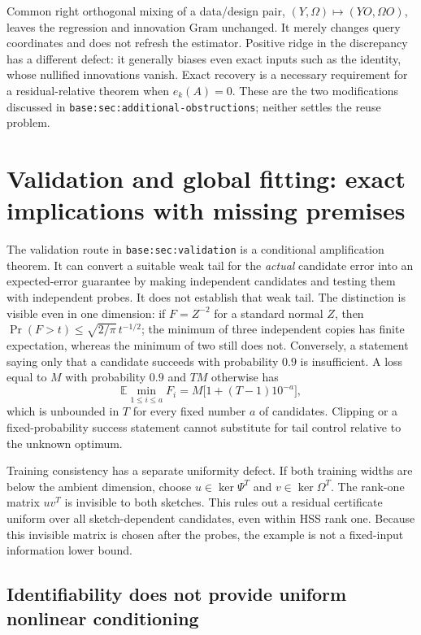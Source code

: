 \documentclass[11pt,oneside,openany,a4paper]{report}
\numberwithin{equation}{chapter}
\theoremstyle{definition}
\theoremstyle{remark}
\begin{document}
Common right orthogonal mixing of a data/design pair,
$(Y,\Omega)\mapsto(YO,\Omega O)$, leaves the regression and innovation
Gram unchanged.  It merely changes query coordinates and does not
refresh the estimator.  Positive ridge in the discrepancy has a
different defect: it generally biases even exact inputs such as the
identity, whose nullified innovations vanish.  Exact recovery is a
necessary requirement for a residual-relative theorem when
$e_k(A)=0$.  These are the two modifications discussed in
\texttt{base:sec:additional-obstructions}; neither settles the reuse
problem.

\section{Validation and global fitting: exact implications with missing premises}
\label{origobs:validation}

The validation route in \texttt{base:sec:validation} is a conditional
amplification theorem.  It can convert a suitable weak tail for the
\emph{actual} candidate error into an expected-error guarantee by making
independent candidates and testing them with independent probes.  It
does not establish that weak tail.  The distinction is visible even in
one dimension: if $F=Z^{-2}$ for a standard normal $Z$, then
$\Pr(F>t)\le\sqrt{2/\pi}\,t^{-1/2}$; the minimum of three independent
copies has finite expectation, whereas the minimum of two still does
not.  Conversely, a statement saying only that a candidate succeeds
with probability $0.9$ is insufficient.  A loss equal to $M$ with
probability $0.9$ and $TM$ otherwise has
\[
 \mathbb E\min_{1\le i\le a}F_i
 =M\bigl[1+(T-1)10^{-a}\bigr],
\]
which is unbounded in $T$ for every fixed number $a$ of candidates.
Clipping or a fixed-probability success statement cannot substitute for
tail control relative to the unknown optimum.

Training consistency has a separate uniformity defect.  If both
training widths are below the ambient dimension, choose
$u\in\ker\Psi^T$ and $v\in\ker\Omega^T$.  The rank-one matrix $uv^T$ is
invisible to both sketches.  This rules out a residual certificate
uniform over all sketch-dependent candidates, even within HSS rank one.
Because this invisible matrix is chosen after the probes, the example
is not a fixed-input information lower bound.

\subsection{Identifiability does not provide uniform nonlinear conditioning}
\end{document}
